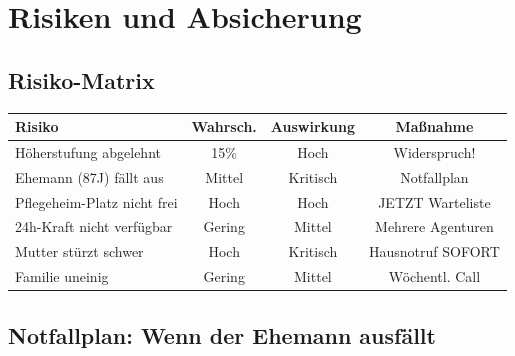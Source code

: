 \documentclass[11pt,a4paper]{article}
\begin{document}
\section{Risiken und Absicherung}

\subsection{Risiko-Matrix}

\begin{center}
\begin{tabular}{lccc}
\toprule
\textbf{Risiko} & \textbf{Wahrsch.} & \textbf{Auswirkung} & \textbf{Maßnahme} \\
\midrule
Höherstufung abgelehnt & 15\% & Hoch & Widerspruch! \\
Ehemann (87J) fällt aus & Mittel & Kritisch & Notfallplan \\
Pflegeheim-Platz nicht frei & Hoch & Hoch & JETZT Warteliste \\
24h-Kraft nicht verfügbar & Gering & Mittel & Mehrere Agenturen \\
Mutter stürzt schwer & Hoch & Kritisch & Hausnotruf SOFORT \\
Familie uneinig & Gering & Mittel & Wöchentl. Call \\
\bottomrule
\end{tabular}
\end{center}

\subsection{Notfallplan: Wenn der Ehemann ausfällt}
\end{document}

